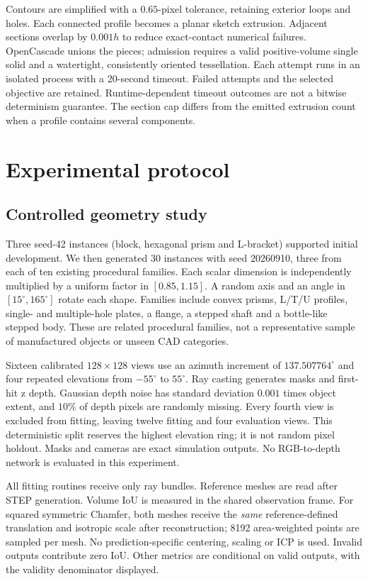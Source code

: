 \documentclass[10pt]{article}
\begin{document}
Contours are simplified with a $0.65$-pixel tolerance, retaining exterior loops
and holes. Each connected profile becomes a planar sketch extrusion. Adjacent
sections overlap by $0.001h$ to reduce exact-contact numerical failures.
OpenCascade unions the pieces; admission requires a valid positive-volume
single solid and a watertight, consistently oriented tessellation. Each attempt
runs in an isolated process with a 20-second timeout. Failed attempts and the
selected objective are retained. Runtime-dependent timeout outcomes are not a
bitwise determinism guarantee. The section cap differs from the emitted
extrusion count when a profile contains several components.

\section{Experimental protocol}
\subsection{Controlled geometry study}
Three seed-42 instances (block, hexagonal prism and L-bracket) supported initial
development. We then generated 30 instances with seed 20260910, three from each
of ten existing procedural families. Each scalar dimension is independently
multiplied by a uniform factor in $[0.85,1.15]$. A random axis and an angle in
$[15^\circ,165^\circ]$ rotate each shape. Families include convex prisms,
L/T/U profiles, single- and multiple-hole plates, a flange, a stepped shaft and
a bottle-like stepped body. These are related procedural families, not a
representative sample of manufactured objects or unseen CAD categories.

Sixteen calibrated $128\times128$ views use an azimuth increment of
$137.507764^\circ$ and four repeated elevations from $-55^\circ$ to $55^\circ$.
Ray casting generates masks and first-hit z depth. Gaussian depth noise has
standard deviation $0.001$ times object extent, and $10\%$ of depth pixels are
randomly missing. Every fourth view is excluded from fitting, leaving twelve
fitting and four evaluation views. This deterministic split reserves the highest
elevation ring; it is not random pixel holdout. Masks and cameras are exact
simulation outputs. No RGB-to-depth network is evaluated in this experiment.

All fitting routines receive only ray bundles. Reference meshes are read after
STEP generation. Volume IoU is measured in the shared observation frame. For
squared symmetric Chamfer, both meshes receive the \emph{same} reference-defined
translation and isotropic scale after reconstruction; 8192 area-weighted points
are sampled per mesh. No prediction-specific centering, scaling or ICP is used.
Invalid outputs contribute zero IoU. Other metrics are conditional on valid
outputs, with the validity denominator displayed.
\end{document}
